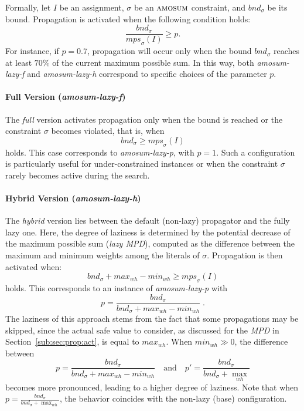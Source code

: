 \documentclass[preprint,authoryear]{elsarticle}
\newcommand{\wh}{\mathit{wh}}
\newcommand{\mps}{\mathit{mps}}
\newcommand{\bnd}{\mathit{bnd}}
\theoremstyle{definition}
\def\amosum{\ensuremath{\textsc{amosum}}\xspace}
\begin{document}
Formally, let $I$ be an assignment, $\sigma$ be an \amosum constraint, and $\bnd_\sigma$ be its bound.  
Propagation is activated when the following condition holds:
$$
\frac{\bnd_\sigma}{\mps_\sigma(I)} \geq p.
$$
For instance, if $p = 0.7$, propagation will occur only when the bound $\bnd_\sigma$ reaches at least $70\%$ of the current maximum possible sum.  
In this way, both \emph{amosum-lazy-f} and \emph{amosum-lazy-h} correspond to specific choices of the parameter $p$.

\paragraph{Full Version (\emph{amosum-lazy-f})}
The \emph{full} version activates propagation only when the bound is reached or the constraint $\sigma$ becomes violated, that is, when
$$
\bnd_\sigma \geq \mps_\sigma(I)
$$
holds. This case corresponds to \emph{amosum-lazy-p}, with $p = 1$.  
Such a configuration is particularly useful for under-constrained instances or when the constraint $\sigma$ rarely becomes active during the search.

\paragraph{Hybrid Version (\emph{amosum-lazy-h})}
The \emph{hybrid} version lies between the default (non-lazy) propagator and the fully lazy one.  
Here, the degree of laziness is determined by the potential decrease of the maximum possible sum (\emph{lazy MPD}), computed as the difference between the maximum and minimum weights among the literals of $\sigma$.
Propagation is then activated when:
$$
\bnd_\sigma + \mathit{max}_\wh - \mathit{min}_\wh \geq \mps_\sigma(I)
$$
holds. This corresponds to an instance of \emph{amosum-lazy-p} with
$$
p = \frac{\bnd_\sigma}{\bnd_\sigma + \mathit{max}_\wh - \mathit{min}_\wh}\; .
$$
The laziness of this approach stems from the fact that some propagations may be skipped, since the actual safe value to consider, as discussed for the \textit{MPD} in Section~\ref{sub:sec:prop:act}, is equal to $\mathit{max}_\wh$.  
When $\mathit{min}_\wh \gg 0$, the difference between 
$$
p = \frac{\bnd_\sigma}{\bnd_\sigma + \mathit{max}_\wh - \mathit{min}_\wh} \quad \text{and} \quad p' = \frac{\bnd_\sigma}{\bnd_\sigma + \max_\wh}
$$
becomes more pronounced, leading to a higher degree of laziness.  
Note that when $p = \frac{\bnd_\sigma}{\bnd_\sigma + \max_\wh}$, the behavior coincides with the non-lazy (base) configuration.
\end{document}
